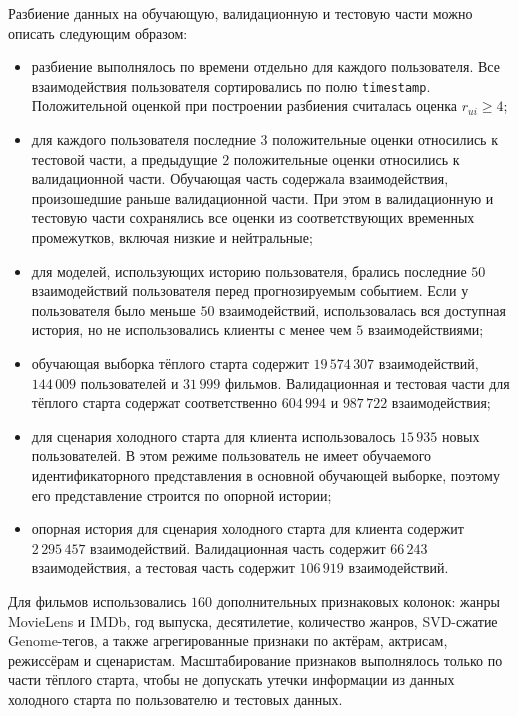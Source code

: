 \documentclass[12pt,fleqn]{article}
\begin{document}
Разбиение данных на обучающую, валидационную и тестовую части можно описать следующим
образом:
\begin{itemize}
    \item разбиение выполнялось по времени отдельно для каждого пользователя.
    Все взаимодействия пользователя сортировались по полю \texttt{timestamp}.
    Положительной оценкой при построении разбиения считалась оценка
    $r_{ui} \geq 4$;

    \item для каждого пользователя последние $3$ положительные оценки
    относились к тестовой части, а предыдущие $2$ положительные оценки
    относились к валидационной части. Обучающая часть содержала взаимодействия,
    произошедшие раньше валидационной части. При этом в валидационную и
    тестовую части сохранялись все оценки из соответствующих временных
    промежутков, включая низкие и нейтральные;

    \item для моделей, использующих историю пользователя, брались последние
    $50$ взаимодействий пользователя перед прогнозируемым событием. Если у
    пользователя было меньше $50$ взаимодействий, использовалась вся доступная
    история, но не использовались клиенты с менее чем $5$ взаимодействиями;

    \item обучающая выборка тёплого старта содержит $19\,574\,307$
    взаимодействий, $144\,009$ пользователей и $31\,999$ фильмов. Валидационная
    и тестовая части для тёплого старта содержат соответственно $604\,994$ и
    $987\,722$ взаимодействия;

    \item для сценария холодного старта для клиента использовалось $15\,935$
    новых пользователей. В этом режиме пользователь не имеет обучаемого
    идентификаторного представления в основной обучающей выборке, поэтому его
    представление строится по опорной истории;

    \item опорная история для сценария холодного старта для клиента содержит
    $2\,295\,457$ взаимодействий. Валидационная часть содержит $66\,243$
    взаимодействия, а тестовая часть содержит $106\,919$ взаимодействий.
\end{itemize}

Для фильмов использовались $160$ дополнительных признаковых колонок: жанры MovieLens и IMDb,
год выпуска, десятилетие, количество жанров, SVD-сжатие Genome-тегов, а также
агрегированные признаки по актёрам, актрисам, режиссёрам и сценаристам.
Масштабирование признаков выполнялось только по части тёплого старта, чтобы не
допускать утечки информации из данных холодного старта по пользователю и тестовых данных.
\end{document}
